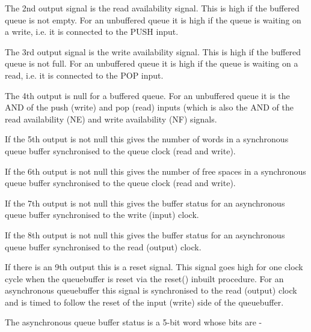                 The 2nd output signal is the read availability signal. This is
                high if the buffered queue is not empty. For an unbuffered queue
                it is high if the queue is waiting on a write, i.e. it is
                connected to the PUSH input.
                
                The 3rd output signal is the write availability signal. This is
                high if the buffered queue is not full. For an unbuffered queue
                it is high if the queue is waiting on a read, i.e. it is
                connected to the POP input.
                
                The 4th output is null for a buffered queue. For an unbuffered
                queue it is the AND of the push (write) and pop (read) inputs
                (which is also the AND of the read availability (NE) and write
                availability (NF) signals.

                If the 5th output is not null this gives the number of words in
                a synchronous queue buffer synchronised to the queue clock (read
                and write).

                If the 6th output is not null this gives the number of free
                spaces in a synchronous queue buffer synchronised to the queue
                clock (read and write).

                If the 7th output is not null this gives the buffer status for
                an asynchronous queue buffer synchronised to the write (input)
                clock.

                If the 8th output is not null this gives the buffer status for
                an asynchronous queue buffer synchronised to the read (output)
                clock.

                If there is an 9th output this is a reset signal. This
                signal goes high for one clock cycle when the queuebuffer is
                reset via the reset() inbuilt procedure. For an asynchronous
                queuebuffer this signal is synchronised to the read (output)
                clock and is timed to follow the reset of the input (write)
                side of the queuebuffer.
            
                The asynchronous queue buffer status is a 5-bit word
                whose bits are -
                
